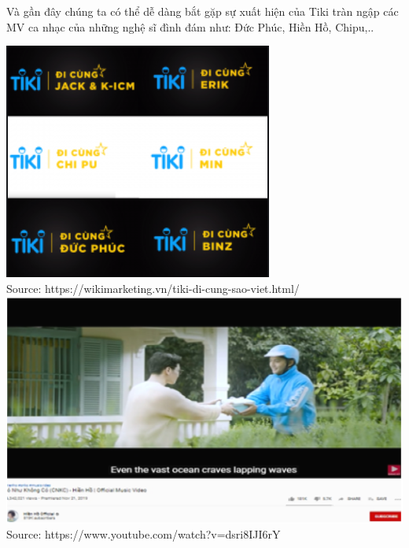 \documentclass[13pt,a4paper]{article}
\begin{document}
    Và gần đây chúng ta có thể dễ dàng bắt gặp sự xuất hiện của Tiki tràn ngập các MV ca nhạc của những nghệ sĩ đình đám như: Đức Phúc, Hiền Hồ, Chipu,..
    \\\begin{center}
    \includegraphics[scale=0.8]{images/tiki.png} \\
    \fontsize{10pt}{1.2pt}\selectfont
    Source: https://wikimarketing.vn/tiki-di-cung-sao-viet.html/ 
    \includegraphics[scale=0.7]{images/conhungkhongco.png} \\
    \fontsize{10pt}{1.2pt}\selectfont
    Source: https://www.youtube.com/watch?v=dsri8IJI6rY
    \end{center}
\end{document}

